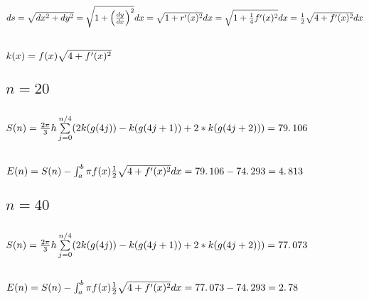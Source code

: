 \documentclass{article}
\begin{document}
\subsection{$ds=\protect\sqrt{dx^{2}+dy^{2}}=\protect\sqrt{1+\left( \frac{dy%
}{dx}\right) ^{2}}dx=\protect\sqrt{1+r^{\prime }(x)^{2}}dx=\protect\sqrt{1+%
\frac{1}{4}f^{\prime }(x)^{2}}dx=\frac{1}{2}\protect\sqrt{4+f^{\prime
}(x)^{2}}dx$}

\subsection{$k(x)=f(x)\protect\sqrt{4+f^{\prime }(x)^{2}}$}

\bigskip 

\bigskip 

\subsection{$n=20$}

\subsection{$S(n)=\frac{2\protect\pi }{3}h\sum%
\limits_{j=0}^{n/4}(2k(g(4j))-k(g(4j+1))+2\ast k(g(4j+2)))=79.\,\allowbreak
106\allowbreak $}

\subsection{$E(n)=S(n)-\protect\int_{a}^{b}\protect\pi f(x)\frac{1}{2}%
\protect\sqrt{4+f^{\prime }(x)^{2}}dx=79.\,\allowbreak 106\allowbreak
-\allowbreak \allowbreak 74.\,\allowbreak 293=\allowbreak 4.\,\allowbreak 813
$}

\bigskip 

\subsection{$n=40$}

\subsection{$S(n)=\frac{2\protect\pi }{3}h\sum%
\limits_{j=0}^{n/4}(2k(g(4j))-k(g(4j+1))+2\ast k(g(4j+2)))=\allowbreak
77.\,\allowbreak 073$}

\subsection{$E(n)=S(n)-\protect\int_{a}^{b}\protect\pi f(x)\frac{1}{2}%
\protect\sqrt{4+f^{\prime }(x)^{2}}dx=\allowbreak 77.\,\allowbreak
073\allowbreak -\allowbreak \allowbreak 74.\,\allowbreak 293=\allowbreak
2.\,\allowbreak 78$}
\end{document}
